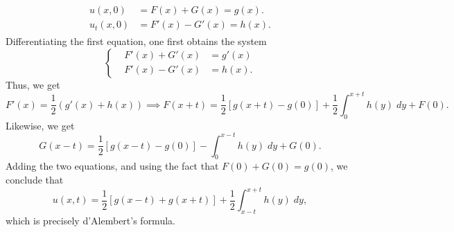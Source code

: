 \documentclass{article}
\numberwithin{equation}{section}
\begin{document}
\begin{enumerate}[itemsep =-2pt,label = (\alph{*})]
		\begin{align*}
			\begin{split}
				u(x, 0) &= F(x) + G(x) = g(x). \\
				u_{t}(x, 0) &= F'(x) - G'(x) = h(x). 
			\end{split}
		\end{align*}
		Differentiating the first equation, one first obtains the system 
		\begin{equation*}
			\left\{
			\begin{alignedat}{2}
				&F'(x) + G'(x) &= g'(x) \\
				&F'(x) - G'(x) &= h(x). 
			\end{alignedat}
			\right. 
		\end{equation*} 
		Thus, we get 
		\begin{equation*}
			F'(x) = \frac{1}{2}(g'(x) +h(x)) \implies F(x + t) = \frac{1}{2}[g(x+ t) - g(0)] + \frac{1}{2}\int_{0}^{x + t}h(y)\;dy + F(0). 
		\end{equation*}
		Likewise, we get 
		\begin{equation*}
			G(x-t) = \frac{1}{2}[g(x - t) - g(0)] -\int_{0}^{x - t}h(y)\;dy + G(0). 
		\end{equation*}
		Adding the two equations, and using the fact that $F(0) + G(0) = g(0)$, we conclude that 
		\begin{equation*}
			u(x,t) = \frac{1}{2}[g(x - t) + g(x + t)] + \frac{1}{2}\int_{x - t}^{x + t}h(y)\;dy, 
		\end{equation*}
		which is precisely d'Alembert's formula. 
	\end{enumerate}
	
\end{document}
